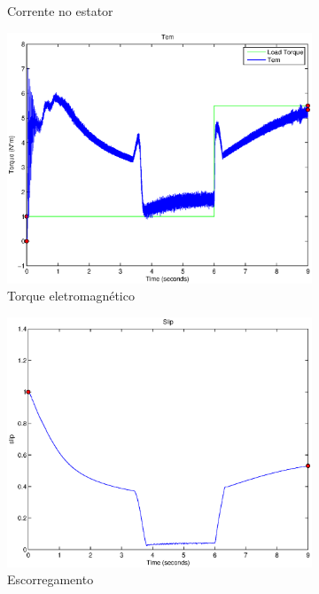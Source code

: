 \documentclass{article}
\begin{document}
\begin{figure}[H]
\begin{subfigure}[b]{0.49\linewidth}
		\caption{Corrente no estator}
	\end{subfigure}
	\begin{subfigure}[b]{0.49\linewidth}
		\centering
		\includegraphics[width=\linewidth]{matlab/tem}
		\caption{Torque eletromagnético}
	\end{subfigure}
	\begin{subfigure}[b]{0.49\linewidth}
		\centering
		\includegraphics[width=\linewidth]{matlab/slip}
		\caption{Escorregamento}
	\end{subfigure}
	\begin{subfigure}[b]{0.49\linewidth}

\end{subfigure}
\end{figure}
\end{document}

